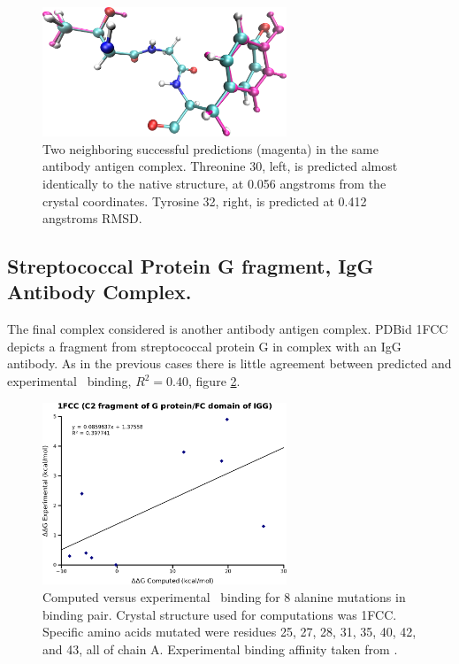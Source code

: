 \begin{figure}[h]
    \centering
    \includegraphics[width=0.65\textwidth,height=0.3\textheight,keepaspectratio]{figures/mutation_side_chain_images/1dvf_chain_b_30_and_32.png}
    \caption{Two neighboring successful predictions (magenta) in the same antibody antigen complex.
    Threonine 30, left, is predicted almost identically to the native structure, at 0.056 angstroms from the crystal coordinates.
    Tyrosine 32, right, is predicted at 0.412 angstroms RMSD.}
    \label{figure:computational_mutation_scanning/1DVF_B_30_and_32}
\end{figure}

\FloatBarrier
\subsection{Streptococcal Protein G fragment, IgG Antibody Complex.}
The final complex considered is another antibody antigen complex.
PDBid 1FCC depicts a fragment from streptococcal protein G in complex with an IgG antibody.
As in the previous cases there is little agreement between predicted and experimental \ddg\ binding, $R^{2}=0.40$, figure \ref{figure:computational_mutation_scanning/1FCC_ddg}.

\begin{figure}[h]
    \centering
    \includegraphics[width=0.65\textwidth]{figures/1fcc.png}
    \caption{Computed versus experimental \ddg\ binding for 8 alanine mutations in  binding pair.
    Crystal structure used for computations was 1FCC.
    Specific amino acids mutated were residues 25, 27, 28, 31, 35, 40, 42, and 43, all of chain A.
    Experimental binding affinity taken from \protect\cite{thorn2001asedb}.}
    \label{figure:computational_mutation_scanning/1FCC_ddg}
\end{figure}

